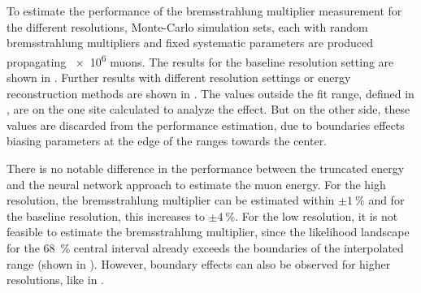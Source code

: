 To estimate the performance of the bremsstrahlung multiplier measurement for the different resolutions, Monte-Carlo simulation sets, each with random bremsstrahlung multipliers and fixed systematic parameters are produced propagating \num{e6} muons.
The results for the baseline resolution setting are shown in .%
Further results with different resolution settings or energy reconstruction methods are shown in .
The values outside the fit range, defined in , are on the one site calculated to analyze the effect.
But on the other side, these values are discarded from the performance estimation, due to boundaries effects biasing parameters at the edge of the ranges towards the center.

There is no notable difference in the performance between the truncated energy and the neural network approach to estimate the muon energy.
For the high resolution, the bremsstrahlung multiplier can be estimated within $\pm\SI{1}{\%}$ and for the baseline resolution, this increases to $\pm\SI{4}{\%}$.
For the low resolution, it is not feasible to estimate the bremsstrahlung multiplier, since the likelihood landscape for the \SI{68}{\%} central interval already exceeds the boundaries of the interpolated range (shown in ).
However, boundary effects can also be observed for higher resolutions, like in .

